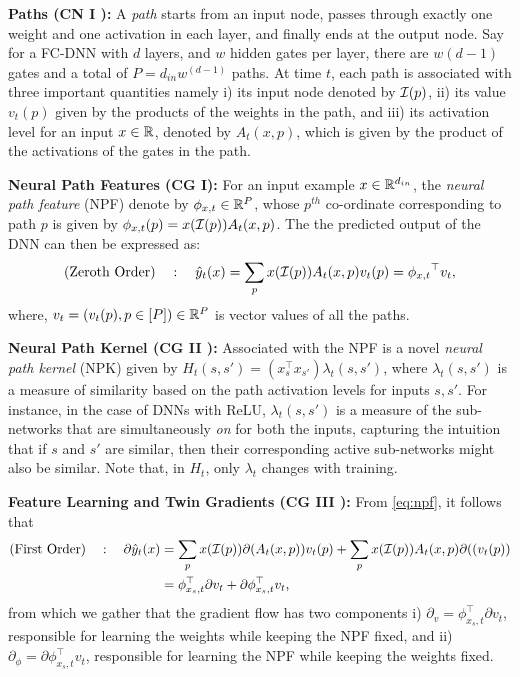 \documentclass{article}
\begin{document}
\textbf{Paths (CN I ):}  A \emph{path} starts from an input node, passes through exactly one weight and one activation in each layer, and finally ends at the output node. Say for a FC-DNN with $d$ layers, and $w$ hidden gates per layer, there are $w(d-1)$ gates and a total of $P=d_{in}w^{(d-1)}$ paths. At time $t$, each path is associated with three important quantities namely i) its input node denoted by $\mathcal{I}(p)$, ii) its value $v_t(p)$ given by the products of the weights in the path, and  iii) its activation level for an input $x\in\mathbb{R}$, denoted by $A_t(x,p)$, which is given by the product of the activations of the gates in the path.

\textbf{Neural Path Features (CG I):}  For an input example $x\in \mathbb{R}^{d_{in}}$, the \emph{neural path feature} (NPF) denote by $\phi_{x,t}\in \mathbb{R}^P$,  whose $p^{th}$ co-ordinate corresponding to path $p$ is given by $\phi_{x,t}(p)=x(\mathcal{I}(p))A_t(x,p)$. The 
the predicted output of the DNN can then be expressed as:
\begin{align}\label{eq:npf}
\text{(Zeroth Order)}\quad: \quad \hat{y}_t(x)=\sum_{p}x(\mathcal{I}(p))A_t(x,p)v_t(p)={\phi_{x,t}}^\top v_t, 
\end{align}
where, $v_t=(v_t(p),p\in[P])\in \mathbb{R}^P$ is vector values of all the paths.

\textbf{Neural Path Kernel (CG II ):} Associated with the NPF is a novel \emph{neural path kernel} (NPK) given by  $H_t(s,s')=(x_s^\top x_{s'})\lambda_t(s,s')$, where $\lambda_t(s,s')$ is a measure of similarity based on the path activation levels for inputs $s,s'$. For instance, in the case of DNNs with ReLU, $\lambda_t(s,s')$ is a measure of the sub-networks that are simultaneously \emph{on} for both the inputs, capturing the intuition that if $s$ and $s'$ are similar, then their corresponding active sub-networks might also be similar. Note that, in $H_t$, only $\lambda_t$ changes with training. 

\textbf{Feature Learning and Twin Gradients (CG III ):} From \eqref{eq:npf}, it follows that
\begin{align}\label{eq:npfgrad}
\text{(First Order)}\quad: \quad \partial \hat{y}_t(x)&=\sum_{p}x(\mathcal{I}(p)) \partial(A_t(x,p)) v_t(p)+ \sum_{p}x(\mathcal{I}(p)) A_t(x,p) \partial((v_t(p))\nonumber\\
&=\phi^\top_{x_s,t} {\partial} v_t + {\partial} \phi^\top_{x_s,t} v_t,
\end{align}
from which we gather that the gradient flow has two components i) $\partial_{v}= \phi^\top_{x_s,t} {\partial} v_t$, responsible for learning the weights while keeping the NPF fixed, and ii) $ \partial_{\phi}={\partial} \phi^\top_{x_s,t} v_t$, responsible for learning the NPF while keeping the weights fixed. 
\end{document}
